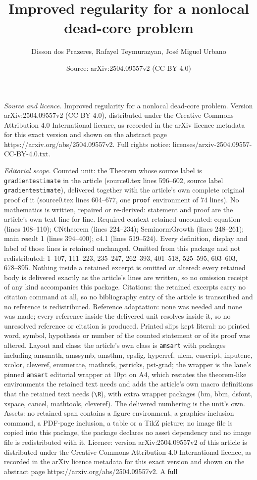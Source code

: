\documentclass[10pt,a4paper]{amsart}
\title[Improved regularity for a nonlocal dead-core problem]{Improved regularity for a nonlocal dead-core problem}
\author{Disson dos Prazeres, Rafayel Teymurazyan, Jos\'e Miguel Urbano}
\date{Source: arXiv:2504.09557v2 (CC BY 4.0)}
\begin{document}
\maketitle

\noindent\emph{Source and licence.} Improved regularity for a nonlocal dead-core problem. Version arXiv:2504.09557v2 (CC BY 4.0), distributed under the Creative Commons Attribution 4.0 International licence, as recorded in the arXiv licence metadata for this exact version and shown on the abstract page https://arxiv.org/abs/2504.09557v2. Full rights notice: licenses/arxiv-2504.09557-CC-BY-4.0.txt.\par\smallskip

\noindent\textit{Editorial scope.} Counted unit: the Theorem whose source label is \texttt{gradientestimate} in the article (source0.tex lines 596--602, source label \texttt{gradientestimate}), delivered together with the article's own complete original proof of it (source0.tex lines 604--677, one \texttt{proof} environment of 74 lines). No mathematics is written, repaired or re-derived: statement and proof are the article's own text line for line. Required context retained uncounted: equation (lines 108--110); CNtheorem (lines 224--234); SeminormGrowth (lines 248--261); main result 1 (lines 394--400); c4.1 (lines 519--524). Every definition, display and label of those lines is retained unchanged. Omitted from this package and not redistributed: 1--107, 111--223, 235--247, 262--393, 401--518, 525--595, 603--603, 678--895. Nothing inside a retained excerpt is omitted or altered: every retained body is delivered exactly as the article's lines are written, so no omission receipt of any kind accompanies this package. Citations: the retained excerpts carry no citation command at all, so no bibliography entry of the article is transcribed and no reference is redistributed. Reference adaptation: none was needed and none was made; every reference inside the delivered unit resolves inside it, so no unresolved reference or citation is produced. Printed slips kept literal: no printed word, symbol, hypothesis or number of the counted statement or of its proof was altered. Layout and class: the article's own class is \texttt{amsart} with packages including amsmath, amssymb, amsthm, epsfig, hyperref, ulem, euscript, inputenc, xcolor, cleveref, enumerate, mathrsfs, pstricks, pst-grad; the wrapper is the lane's pinned \texttt{amsart} editorial wrapper at 10pt on A4, which restates the theorem-like environments the retained text needs and adds the article's own macro definitions that the retained text needs (\texttt{\textbackslash R}), with extra wrapper packages (bm, bbm, dsfont, xspace, cancel, mathtools, cleveref). The delivered numbering is the unit's own. Assets: no retained span contains a figure environment, a graphics-inclusion command, a PDF-page inclusion, a table or a TikZ picture; no image file is copied into this package, the package declares no asset dependency and no image file is redistributed with it. Licence: version arXiv:2504.09557v2 of this article is distributed under the Creative Commons Attribution 4.0 International licence, as recorded in the arXiv licence metadata for this exact version and shown on the abstract page https://arxiv.org/abs/2504.09557v2. A full 
\end{document}
